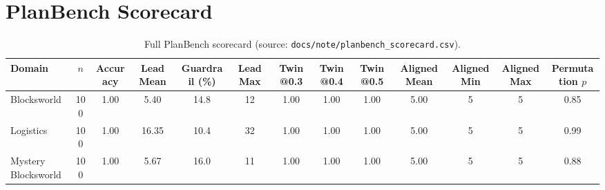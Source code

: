 \documentclass[11pt]{article}
\begin{document}
\section{PlanBench Scorecard}
\label{app:scorecard}
\begin{table}[h]
  \centering
  \caption{Full PlanBench scorecard (source: \texttt{docs/note/planbench\_scorecard.csv}).}
  \begin{tabular}{lcccccccccccc}
    \hline
    Domain & $n$ & Accuracy & Lead Mean & Guardrail (\%) & Lead Max & Twin@0.3 & Twin@0.4 & Twin@0.5 & Aligned Mean & Aligned Min & Aligned Max & Permutation $p$\\
    \hline
    Blocksworld & 100 & 1.00 & 5.40 & 14.8 & 12 & 1.00 & 1.00 & 1.00 & 5.00 & 5 & 5 & 0.85\\
    Logistics & 100 & 1.00 & 16.35 & 10.4 & 32 & 1.00 & 1.00 & 1.00 & 5.00 & 5 & 5 & 0.99\\
    Mystery Blocksworld & 100 & 1.00 & 5.67 & 16.0 & 11 & 1.00 & 1.00 & 1.00 & 5.00 & 5 & 5 & 0.88\\
    \hline
  \end{tabular}
\end{table}
\end{document}

